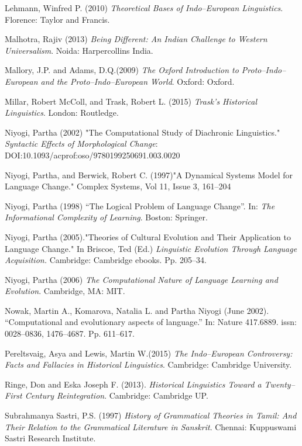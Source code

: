 \begin{thebibliography}{99}
  Lehmann, Winfred P. (2010) \textit{Theoretical Bases of Indo–European Linguistics}. Florence: Taylor and Francis.

  Malhotra, Rajiv (2013) \textit{Being Different: An Indian Challenge to Western Universalism}. Noida: Harpercollins India.

  Mallory, J.P. and Adams, D.Q.(2009) \textit{The Oxford Introduction to Proto–Indo–European and the Proto–Indo–European World}. Oxford: Oxford.

  Millar, Robert McColl, and Trask, Robert L. (2015) \textit{Trask's Historical Linguistics}. London: Routledge.

  Niyogi, Partha (2002) "The Computational Study of Diachronic Linguistics." \textit{Syntactic Effects of Morphological Change}: DOI:10.1093/acprof:oso/9780199250691.003.0020

  Niyogi, Partha, and Berwick, Robert C. (1997)"A Dynamical Systems Model for Language Change." Complex Systems, Vol 11, Issue 3, 161–204

  Niyogi, Partha (1998) “The Logical Problem of Language Change”. In: \textit{The Informational Complexity of Learning}. Boston: Springer.

  Niyogi, Partha (2005)."Theories of Cultural Evolution and Their Application to Language Change." In Briscoe, Ted (Ed.) \textit{Linguistic Evolution Through Language Acquisition.} Cambridge: Cambridge ebooks. Pp. 205–34.

  Niyogi, Partha (2006) \textit{The Computational Nature of Language Learning and Evolution}. Cambridge, MA: MIT.

  Nowak, Martin A., Komarova, Natalia L. and Partha Niyogi (June 2002). “Computational and evolutionary aspects of language.” In: Nature 417.6889. issn: 0028–0836, 1476–4687. Pp. 611–617.

  Pereltsvaig, Asya and Lewis, Martin W.(2015) \textit{The Indo–European Controversy: Facts and Fallacies in Historical Linguistics}. Cambridge: Cambridge University.

  Ringe, Don and Eska Joseph F. (2013). \textit{Historical Linguistics Toward a Twenty–First Century Reintegration}. Cambridge: Cambridge UP.

  Subrahmanya Sastri, P.S. (1997) \textit{History of Grammatical Theories in Tamil: And Their Relation to the Grammatical Literature in Sanskrit}. Chennai: Kuppuswami Sastri Research Institute.


\end{thebibliography}
